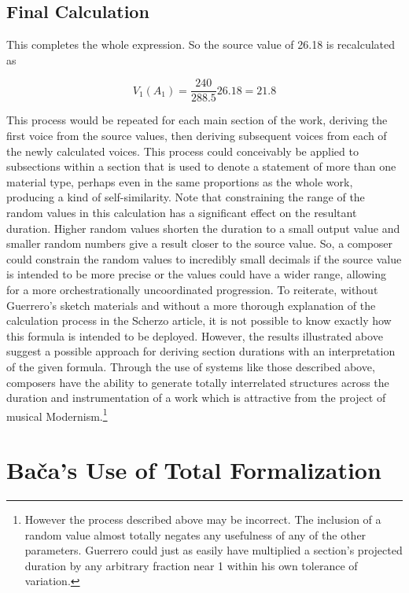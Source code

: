 
\subsection{Final Calculation}

This completes the whole expression. So the source value of 26.18 is recalculated as

\begin{equation}
V_{1}(A_{1}) = \frac{240}{288.5} 26.18 = 21.8
\end{equation}

This process would be repeated for each main section of the work, deriving the first voice from the source values, then deriving subsequent voices from each of the newly calculated voices. This process could conceivably be applied to subsections within a section that is used to denote a statement of more than one material type, perhaps even in the same proportions as the whole work, producing a kind of self-similarity. Note that constraining the range of the random values in this calculation has a significant effect on the resultant duration. Higher random values shorten the duration to a small output value and smaller random numbers give a result closer to the source value. So, a composer could constrain the random values to incredibly small decimals if the source value is intended to be more precise or the values could have a wider range, allowing for a more orchestrationally uncoordinated progression. To reiterate, without Guerrero's sketch materials and without a more thorough explanation of the calculation process in the Scherzo article, it is not possible to know exactly how this formula is intended to be deployed. However, the results illustrated above suggest a possible approach for deriving section durations with an interpretation of the given formula. Through the use of systems like those described above, composers have the ability to generate totally interrelated structures across the duration and instrumentation of a work which is attractive from the project of musical Modernism.\footnote{However the process described above may be incorrect. The inclusion of a random value almost totally negates any usefulness of any of the other parameters. Guerrero could just as easily have multiplied a section's projected duration by any arbitrary fraction near 1 within his own tolerance of variation.}

\section{Bača's Use of Total Formalization}

